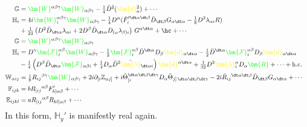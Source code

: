 \documentclass[letter,12pt]{article} %
\def\physical#1{ {\color{green} {\bm {#1}} } }
\def\auxiliary#1{ {\color{yellow} {\bm {#1}} } }
\def\dX{ \auxiliary{d} }
\def\l{ \auxiliary{\lambda} }
\def\Weyl{\physical W}
\def\KK{\physical {\mathcal F}}
\def\Scalar{\physical R}
\begin{document}
{%
\begin{align}
\mathbb G &= \Weyl^{\alpha \beta \gamma}\Weyl_{\alpha \beta \gamma}
	-\tfrac14 \bar D^2 (\dX_a^2)
	+\cdots	
\cr
\mathbb H_i &= 
	4i \Weyl_i^{\alpha \beta \gamma} \Weyl_{\alpha \beta \gamma}
	-\tfrac 14 D^{\alpha} (\bar F_i^{\prime \dt\alpha \dt\beta}\bar D_{\dt\beta} G_{\alpha \dt \alpha} -\tfrac18 D^2 \lambda_{\alpha i} R)
\cr	&+\tfrac 1{24} \left( D^2 \bar D_{\dt \alpha}\lambda_{\alpha i}+ 2 D^\beta \bar D_{\dt \alpha} D_{(\alpha}\lambda_{\beta)i} \right) \, G^{\alpha \dt \alpha} 
	+\hc+\cdots	
\cr
\mathbb G &= \Weyl^{\alpha \beta \gamma} \Weyl_{\alpha \beta \gamma} 
\cr
\mathbb H_i &= D^\gamma \KK_i^{\alpha \beta} \Weyl_{\alpha \beta \gamma}
	-\tfrac 12 \KK_i^{\alpha \beta}\bar D^{\dt \alpha}  D_\beta \dX_{\alpha \dt \alpha}
	-\tfrac 12 \bar D^{\dt \alpha} \KK_i^{\alpha \beta}D_\beta \dX_{\alpha \dt \alpha} 
\cr	&	-\tfrac 1{4} \left( D^\beta \bar D_{\dt \alpha} \KK_{\alpha \beta i} 
	+\tfrac 14 D_\alpha \bar D^2 \bar \l_{\dt \alpha i} \right) \dX^{\alpha \dt \alpha}
	+\tfrac 1{32} D^2 \l_i^\alpha D_\alpha \Scalar
	+\cdots
	+ \mathrm{h.c.}
\cr
\mathbb W_{\alpha ij} &= \tfrac i8 R_{ij}{}^{\beta \gamma} \Weyl_{\alpha \beta \gamma}
	+2i \partial_{[i}\mathbb Z_{\alpha j]} 
	+ i \bar \Theta^{\dt \alpha \dt \beta \dt \gamma}_{[i} D_\alpha \bar \Theta_{j]\, \dt \alpha \dt \beta \dt \gamma}
	-2i \bar R_{ij}{}^{\dt \alpha \dt \beta} \bar D_{\dt \beta} G_{\alpha \dt \alpha}
	+\cdots	
\cr
\mathbb F_{ijk} &= b R_{[ij}{}^{\alpha \beta} F'_{k]\alpha \beta}
	+\cdots	
\cr
\mathbb E_{ijkl} &= a R_{[ij}{}^{\alpha \beta} R_{kl] \alpha \beta} +\cdots 	
\nonumber	
\end{align}
}
In this form, $\mathbb H_y'$ is manifestly real again. 
\end{document}
